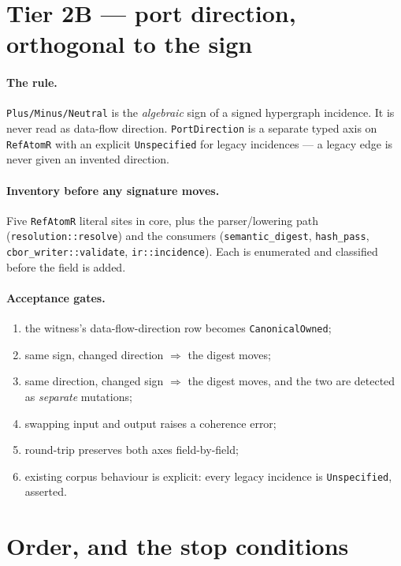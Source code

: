 \documentclass[11pt,a4paper]{article}
\begin{document}
\section{Tier 2B --- port direction, orthogonal to the sign}

\paragraph{The rule.} \texttt{Plus/Minus/Neutral} is the \emph{algebraic} sign of a signed
hypergraph incidence. It is never read as data-flow direction. \texttt{PortDirection} is a separate
typed axis on \texttt{RefAtomR} with an explicit \texttt{Unspecified} for legacy incidences --- a
legacy edge is never given an invented direction.

\paragraph{Inventory before any signature moves.} Five \texttt{RefAtomR} literal sites in core,
plus the parser/lowering path (\texttt{resolution::resolve}) and the consumers
(\texttt{semantic\_digest}, \texttt{hash\_pass}, \texttt{cbor\_writer::validate},
\texttt{ir::incidence}). Each is enumerated and classified before the field is added.

\paragraph{Acceptance gates.}
\begin{enumerate}\small
\item the witness's data-flow-direction row becomes \texttt{CanonicalOwned};
\item same sign, changed direction $\Rightarrow$ the digest moves;
\item same direction, changed sign $\Rightarrow$ the digest moves, and the two are detected as
\emph{separate} mutations;
\item swapping input and output raises a coherence error;
\item round-trip preserves both axes field-by-field;
\item existing corpus behaviour is explicit: every legacy incidence is \texttt{Unspecified}, asserted.
\end{enumerate}

\section{Order, and the stop conditions}
\end{document}
